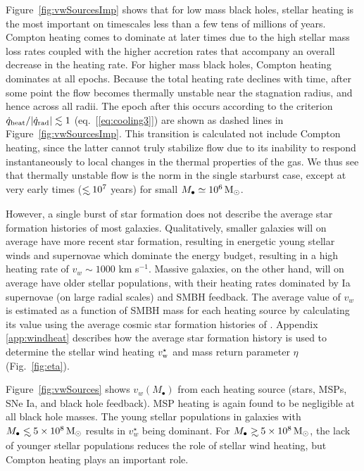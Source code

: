 \documentclass[usenatbib,fleqn]{mn2e}
\newcommand\lsim{\mathrel{\rlap{\lower4pt\hbox{\hskip1pt$\sim$}}
    \raise1pt\hbox{$<$}}}
\newcommand\gsim{\mathrel{\rlap{\lower4pt\hbox{\hskip1pt$\sim$}}
    \raise1pt\hbox{$>$}}}
\newcommand{\Mbh}[1][]{M_{\bullet#1}}
\newcommand{\vwO}{v_{w}}
\begin{document}
Figure~\ref{fig:vwSourcesImp} shows that for low mass black holes, stellar heating is the most important on timescales less than a few tens of millions of years.  Compton heating comes to dominate at later times due to the high stellar mass loss rates coupled with the higher accretion rates that accompany an overall decrease in the heating rate.  For higher mass black holes, Compton heating dominates at all epochs.  Because the total heating rate declines with time, after some point the flow becomes thermally unstable near the stagnation radius, and hence across all radii.  The epoch after this occurs according to the criterion $\dot{q}_{\rm heat}/|\dot{q}_{\rm rad}| \lesssim 1$ (eq.~[\ref{eq:cooling3}]) are shown as dashed lines in Figure~\ref{fig:vwSourcesImp}.  This transition is calculated not include Compton heating, since the latter cannot truly stabilize flow due to its inability to respond instantaneously to local changes in the thermal properties of the gas.  We thus see that thermally unstable flow is the norm in the single starburst case, except at very early times ($\lsim 10^7$ years) for small $\Mbh\simeq 10^6 \Msun$.

However, a single burst of star formation does not describe the
average star formation histories of most galaxies.  Qualitatively,
smaller galaxies will on average have more recent star formation,
resulting in energetic young stellar winds and supernovae which
dominate the energy budget, resulting in a high heating rate of $\vwO
\sim 1000 $ km s$^{-1}$.  Massive galaxies, on the other hand, will on
average have older stellar populations, with their heating rates
dominated by Ia supernovae (on large radial scales) and SMBH feedback.
The average value of $\vwO$ is estimated as a function of SMBH mass
for each heating source by calculating its value using the average
cosmic star formation histories of \citet{MosterNaab+:2013a}.
Appendix \ref{app:windheat} describes how the average star formation
history is used to determine the stellar wind heating $v_{\rm
  w}^{\star}$ and mass return parameter $\eta$ (Fig.~\ref{fig:eta}).

Figure~\ref{fig:vwSources} shows $\vwO(M_{\bullet})$ from each heating
source (stars, MSPs, SNe Ia, and black hole feedback).  MSP heating is
again found to be negligible at all black hole masses.  The young
stellar populations in galaxies with $\Mbh\lsim 5\times 10^{8} \Msun$
results in $v_{w}^{\star}$ being dominant.  For $\Mbh\gsim 5\times 10^{8}
\Msun$, the lack of younger stellar populations reduces the role of
stellar wind heating, but Compton heating plays an important role.
\end{document}
